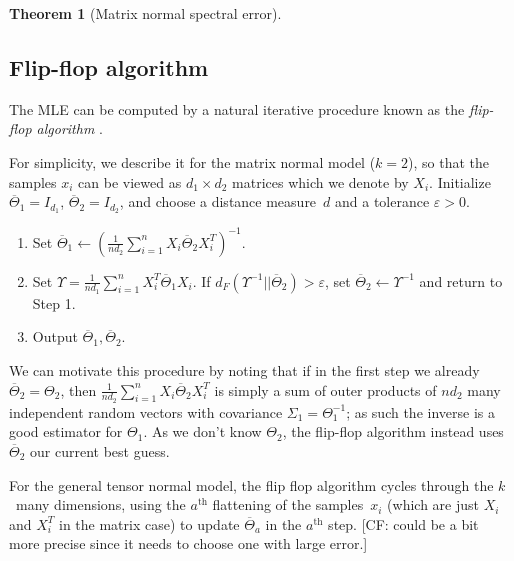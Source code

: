 \documentclass[aos]{imsart}
\newtheorem{theorem}{Theorem}[section]
\theoremstyle{definition}
\numberwithin{equation}{section}
\newcommand{\eps}{\varepsilon}
\newcommand{\samp}{x}
\newcommand{\CF}[1]{{\color{purple}[CF: #1]}}
\begin{document}
\begin{theorem}[Matrix normal spectral error]\label{thm:matrix-normal}
\MatrixSpec
\end{theorem}

\subsection{Flip-flop algorithm}
The MLE can be computed by a natural iterative procedure known as the \emph{flip-flop algorithm} \citep{dutilleul1999mle,gurvits2004classical}.

For simplicity, we describe it for the matrix normal model ($k=2$), so that the samples $\samp_i$ can be viewed as $d_1\times d_2$ matrices which we denote by $X_i$.
Initialize $\overline{\Theta}_1 = I_{d_1}$, $\overline{\Theta}_2 = I_{d_2}$, and choose a distance measure~$d$ and a tolerance $\eps > 0$.
\begin{enumerate}
\item Set $\overline{\Theta}_1 \leftarrow (\frac{1}{n d_2} \sum_{i = 1}^n X_i \overline{\Theta}_2 X_i^T)^{-1}.$
\item\label{it:sinkhorn second} Set $\Upsilon = \frac{1}{n d_1} \sum_{i = 1}^n X_i^T \overline{\Theta}_1 X_i$.
If $d_F( \Upsilon^{-1}|| \overline{\Theta}_2) > \eps$, set $\overline{\Theta}_2 \leftarrow \Upsilon^{-1}$ and return to Step 1.
\item Output $\overline{\Theta}_1, \overline{\Theta}_2$.
\end{enumerate}

We can motivate this procedure by noting that if in the first step we already $\overline{\Theta}_2 = \Theta_2$, then $\frac{1}{n d_2} \sum_{i = 1}^n X_i \overline{\Theta}_2 X_i^T$ is simply a sum of outer products of $nd_2$ many independent random vectors with covariance $\Sigma_1 = \Theta_1^{-1}$; as such the inverse is a good estimator for $\Theta_1$.
As we don't know $\Theta_2$, the flip-flop algorithm instead uses $\overline{\Theta}_2$ our current best guess.

For the general tensor normal model, the flip flop algorithm cycles through the $k$~many dimensions, using the $a^\text{th}$ flattening of the samples~$x_i$ (which are just $X_i$ and $X_i^T$ in the matrix case) to update $\overline{\Theta}_a$ in the $a^\text{th}$ step.
\CF{could be a bit more precise since it needs to choose one with large error.}
\end{document}
